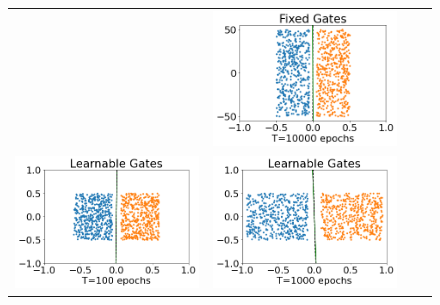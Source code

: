 \begin{figure}[!t]
\begin{minipage}{1\columnwidth}
{\begin{tabular}{cccc}
&
\includegraphics[scale=0.2]{figs/fixed-1e4-ae100.png}
\\
\includegraphics[scale=0.2]{figs/learn-1e2-ae1.png}
&
\includegraphics[scale=0.2]{figs/learn-1e3-ae1.png}
&

\end{tabular}}
\end{minipage}
\end{figure}
